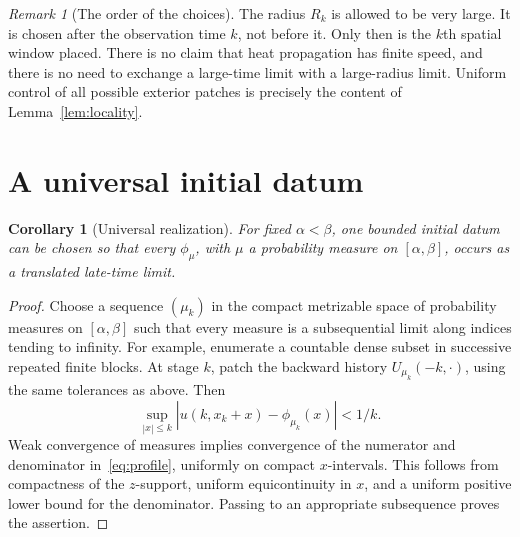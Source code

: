 \documentclass[11pt,a4paper]{article}
\numberwithin{equation}{section}
\newtheorem{corollary}[theorem]{Corollary}
\theoremstyle{remark}\newtheorem{remark}[theorem]{Remark}
\begin{document}
\begin{remark}[The order of the choices]
The radius $R_k$ is allowed to be very large. It is chosen after the observation time $k$, not before it. Only then is the $k$th spatial window placed. There is no claim that heat propagation has finite speed, and there is no need to exchange a large-time limit with a large-radius limit. Uniform control of all possible exterior patches is precisely the content of Lemma~\ref{lem:locality}.
\end{remark}

\section{A universal initial datum}
\begin{corollary}[Universal realization]\label{cor:universal}
For fixed $\alpha<\beta$, one bounded initial datum can be chosen so that every $\phi_\mu$, with $\mu$ a probability measure on $[\alpha,\beta]$, occurs as a translated late-time limit.
\end{corollary}
\begin{proof}
Choose a sequence $(\mu_k)$ in the compact metrizable space of probability measures on $[\alpha,\beta]$ such that every measure is a subsequential limit along indices tending to infinity. For example, enumerate a countable dense subset in successive repeated finite blocks. At stage $k$, patch the backward history $U_{\mu_k}(-k,\cdot)$, using the same tolerances as above. Then
\[
 \sup_{|x|\leq k}|u(k,x_k+x)-\phi_{\mu_k}(x)|<1/k.
\]
Weak convergence of measures implies convergence of the numerator and denominator in~\eqref{eq:profile}, uniformly on compact $x$-intervals. This follows from compactness of the $z$-support, uniform equicontinuity in $x$, and a uniform positive lower bound for the denominator. Passing to an appropriate subsequence proves the assertion.
\end{proof}
\end{document}
